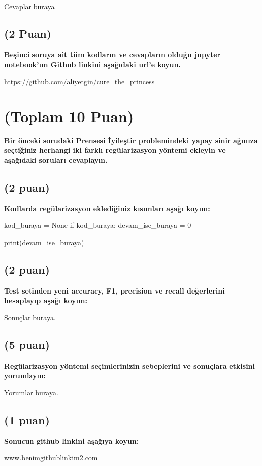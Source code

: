 \documentclass[11pt]{article}
\begin{document}
Cevaplar buraya

\begin{comment}
\begin{figure}[ht!]
    \centering
    \texttt{[image: mypicturehere.png]}
    \caption{Buraya açıklama yazın}
    \label{fig:my_pic}
\end{figure}
\end{comment}

\subsection{(2 Puan)} \textbf{Beşinci soruya ait tüm kodların ve cevapların olduğu jupyter notebook'un Github linkini aşağıdaki url'e koyun.}

\url{https://github.com/aliyetgin/cure_the_princess}

\section{(Toplam 10 Puan)} \textbf{Bir önceki sorudaki Prensesi İyileştir problemindeki yapay sinir ağınıza seçtiğiniz herhangi iki farklı regülarizasyon yöntemi ekleyin ve aşağıdaki soruları cevaplayın.} 

\subsection{(2 puan)} \textbf{Kodlarda regülarizasyon eklediğiniz kısımları aşağı koyun:} 

\begin{python}
kod_buraya = None
if kod_buraya:
    devam_ise_buraya = 0

print(devam_ise_buraya)
\end{python}

\subsection{(2 puan)} \textbf{Test setinden yeni accuracy, F1, precision ve recall değerlerini hesaplayıp aşağı koyun:}

Sonuçlar buraya.

\subsection{(5 puan)} \textbf{Regülarizasyon yöntemi seçimlerinizin sebeplerini ve sonuçlara etkisini yorumlayın:}

Yorumlar buraya.

\subsection{(1 puan)} \textbf{Sonucun github linkini  aşağıya koyun:}

\url{www.benimgithublinkim2.com}
\end{document}

